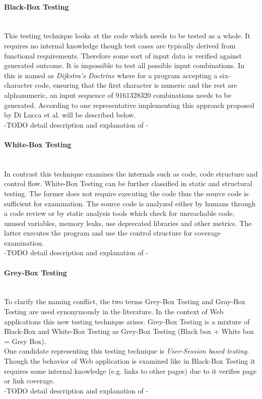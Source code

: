 \documentclass[12pt, notitlepage]{article}
\begin{document}
\paragraph{Black-Box Testing} ~\\
This testing technique looks at the code which needs to be tested as a whole. It requires no internal knowledge though test cases are typically 
derived from functional requirements. Therefore some sort of input data is verified against generated outcome.
It is impossible to test all possible input combinations. In \cite{softare-testing-principles} this is named as \textit{Dijkstra's Doctrine}
where for a program accepting a six-character code, ensuring that the first character is numeric and the rest are alphanumeric, an input 
sequence of 9161328320 combinations needs to be generated.
According to \cite{testing-overview} one representative implementing this approach proposed by Di Lucca et al.\cite{decision-table-testing} will be described below.\\
-TODO detail description and explanation of \cite{decision-table-testing}-
\paragraph{White-Box Testing} ~\\
In contrast this technique examines the internals such as code, code structure and control flow. White-Box Testing can be further classified in
static and structural testing. The former does not require executing the code thus the source code is sufficient for examination. The source code
is analyzed either by humans through a code review or by static analysis tools which check for unreachable code, unused variables, memory leaks, use
deprecated libraries and other metrics. The latter executes the program and use the control structure for coverage examination\cite{structural-testing}.\\
-TODO detail description and explanation of \cite{web-whiteBox-testing}-
\paragraph{Grey-Box Testing} ~\\
To clarify the naming conflict, the two terms Grey-Box Testing and Gray-Box Testing are used synonymously in the literature\cite{bridge-grey}. 
In the context of Web applications this new testing technique arises\cite{web-engineering}. Grey-Box Testing is a mixture of Black-Box and White-Box Testing as Grey-Box Testing (Black box + White box = Grey Box).\\
One candidate representing this testing technique is \textit{User-Session based testing}. Though the behavior of Web application is examined like in
Black-Box Testing it requires some internal knowledge (e.g. links to other pages) due to it verifies page or link coverage.\\
-TODO detail description and explanation of \cite{user-session}-
\end{document}
